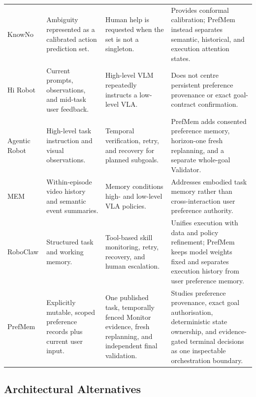 {\begin{longtable}{@{}P{2.35cm}P{4.00cm}P{3.75cm}P{4.35cm}@{}}
    KnowNo \parencite{ren2023knowno} &
    Ambiguity represented as a calibrated action prediction set. &
    Human help is requested when the set is not a singleton. &
    Provides conformal calibration; PrefMem instead separates semantic,
    historical, and execution attention states. \\

    Hi Robot \parencite{shi2025hirobot} &
    Current prompts, observations, and mid-task user feedback. &
    High-level VLM repeatedly instructs a low-level VLA. &
    Does not centre persistent preference provenance or exact goal-contract
    confirmation. \\

    Agentic Robot \parencite{yang2025agenticrobot} &
    High-level task instruction and visual observations. &
    Temporal verification, retry, and recovery for planned subgoals. &
    PrefMem adds consented preference memory, horizon-one fresh replanning,
    and a separate whole-goal Validator. \\

    MEM \parencite{torne2026mem} &
    Within-episode video history and semantic event summaries. &
    Memory conditions high- and low-level VLA policies. &
    Addresses embodied task memory rather than cross-interaction user
    preference authority. \\

    RoboClaw \parencite{li2026roboclaw} &
    Structured task and working memory. &
    Tool-based skill monitoring, retry, recovery, and human escalation. &
    Unifies execution with data and policy refinement; PrefMem keeps model
    weights fixed and separates execution history from user preference memory. \\

    PrefMem &
    Explicitly mutable, scoped preference records plus current user input. &
    One published task, temporally fenced Monitor evidence, fresh replanning,
    and independent final validation. &
    Studies preference provenance, exact goal authorisation, deterministic
    state ownership, and evidence-gated terminal decisions as one inspectable
    orchestration boundary. \\
\end{longtable}
}

\subsection{Architectural Alternatives}

